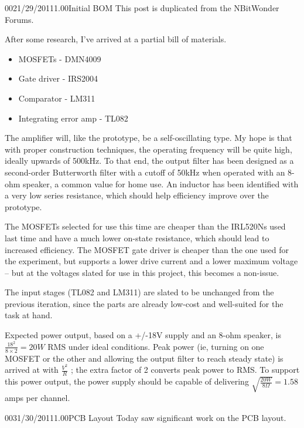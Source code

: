 \documentclass[12pt,letterpaper,onecolumn]{article}
\begin{document}
\begin{nbentry}{002}{1/29/2011}{1.00}{Initial BOM}
This post is duplicated from the NBitWonder Forums.

After some research, I've arrived at a partial bill of materials.

\begin{itemize}
\item MOSFETs - DMN4009
\item Gate driver - IRS2004
\item Comparator - LM311
\item Integrating error amp - TL082
\end{itemize}

The amplifier will, like the prototype, be a self-oscillating type. My hope is that with proper construction techniques, the operating frequency will be quite high, ideally upwards of 500kHz. To that end, the output filter has been designed as a second-order Butterworth filter with a cutoff of 50kHz when operated with an 8-ohm speaker, a common value for home use. An inductor has been identified with a very low series resistance, which should help efficiency improve over the prototype.

The MOSFETs selected for use this time are cheaper than the IRL520Ns used last time and have a much lower on-state resistance, which should lead to increased efficiency. The MOSFET gate driver is cheaper than the one used for the experiment, but supports a lower drive current and a lower maximum voltage -- but at the voltages slated for use in this project, this becomes a non-issue.

The input stages (TL082 and LM311) are slated to be unchanged from the previous iteration, since the parts are already low-cost and well-suited for the task at hand.

Expected power output, based on a +/-18V supply and an 8-ohm speaker, is 
\(
\frac{18^2}{ 8 \times 2} = 20W
\)
 RMS under ideal conditions. Peak power (ie, turning on one MOSFET or the other and allowing the output filter to reach steady state) is arrived at with
\(
\frac{V^2}{ R}
\)
; the extra factor of 2 converts peak power to RMS. To support this power output, the power supply should be capable of delivering
\(
\sqrt{\frac{20W}{8 \Omega}} = 1.58
\)
amps per channel.
\end{nbentry}

\begin{nbentry}{003}{1/30/2011}{1.00}{PCB Layout}
Today saw significant work on the PCB layout.
\end{nbentry}
\end{document}
